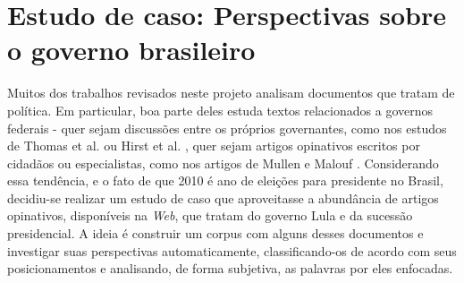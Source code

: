 \chapter{Estudo de caso: Perspectivas sobre o governo brasileiro}
\label{estudo}



Muitos dos trabalhos revisados neste projeto analisam documentos que tratam de política. Em particular, boa parte deles estuda textos relacionados a governos federais - quer sejam discussões entre os próprios governantes, como nos estudos de Thomas et al. \cite{get-out-the-vote} ou Hirst et al. \cite{hirst-et-al}, quer sejam artigos opinativos escritos por cidadãos ou especialistas, como nos artigos de Mullen e Malouf \cite{aaai-politics} \cite{malouf-taking_sides}. Considerando essa tendência, e o fato de que 2010 é ano de eleições para presidente no Brasil, decidiu-se realizar um estudo de caso que aproveitasse a abundância de artigos opinativos, disponíveis na \emph{Web}, que tratam do governo Lula e da sucessão presidencial. A ideia é construir um corpus com alguns desses documentos e investigar suas perspectivas automaticamente, classificando-os de acordo com seus posicionamentos e analisando, de forma subjetiva, as palavras por eles enfocadas.



